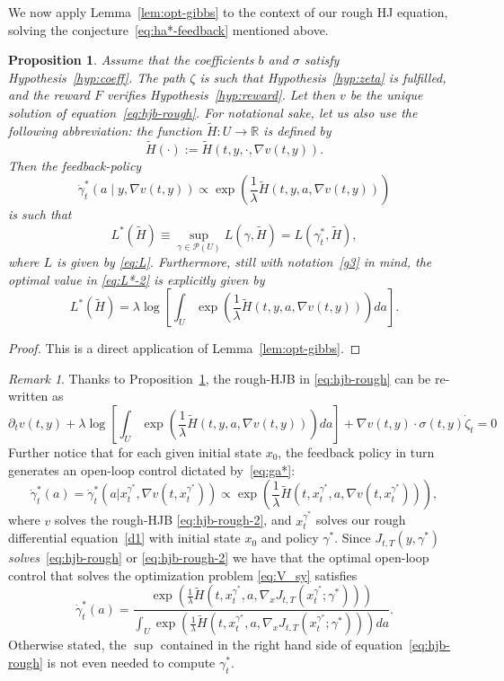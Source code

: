 \documentclass[12pt,reqno]{amsart}
\numberwithin{equation}{section}  %
\newcommand{\1}{{\bf 1}}
\newcommand{\2}{{\bf 2}}
\newcommand{\bzeta}{{\zeta}}
\newcommand{\R}{\mathbb R}
\newcommand{\cp}{\mathcal P}
\newcommand{\ga}{\gamma}
\newcommand{\la}{\lambda}
\newcommand{\si}{\sigma}
\newcommand{\lp}{\left(}
\newcommand{\rp}{\right)}
\newcommand{\lc}{\left[}
\newcommand{\rc}{\right]}
\newtheorem{proposition}[theorem]{Proposition}
\theoremstyle{remark}
\newtheorem{remark}[theorem]{Remark}
\theoremstyle{remark}
\newcommand{\beq}{\begin{equation}}
\newcommand{\eeq}{\end{equation}}
\begin{document}
\noindent
We now apply Lemma~\ref{lem:opt-gibbs} to the context of our rough HJ equation, solving the conjecture~\eqref{eq:ha*-feedback} mentioned above.
\begin{proposition}\label{prop:feedback-policy}
Assume that the coefficients $b$ and $\si$ satisfy Hypothesis~\ref{hyp:coeff}. The path $\bzeta$ is such that Hypothesis~\ref{hyp:zeta} is fulfilled, and the reward $F$ verifies Hypothesis~\ref{hyp:reward}.
Let then $v$ be the unique solution of equation~\eqref{eq:hjb-rough}. 
For notational sake, let us also use the following abbreviation: the function $\tilde{H}:U\to\R$ is defined by
\begin{equation}\label{g3}
\tilde{H}(\cdot) := \tilde{H}(t,y,\cdot,\nabla v(t,y)) .
\end{equation}
Then  the feedback-policy
\beq\label{eq:ga*}
\dot\ga_t^{\ast}(a \mid y, \nabla v(t,y)) \propto \exp \lp \dfrac{1}{\la}\tilde{H}(t,y,a, \nabla v(t,y)) \rp
\eeq
is such that
\beq\label{eq:L*-2}
L^{\ast}(\tilde{H}) \equiv 
\sup_{\ga \in \cp(U)} L(\ga, \tilde{H})
=
L({\ga}_t^{\ast}, \tilde{H}) ,
\eeq
where $L$ is given by \eqref{eq:L}.
Furthermore, still with notation~\eqref{g3} in mind, the optimal value in \eqref{eq:L*-2} is explicitly given by
\beq\label{eq:L*-2-value}
L^{\ast}(\tilde{H}) = \la \log \lc \int_U \exp\lp \frac{1}{\la} \tilde{H} (t,y,a, \nabla v(t,y))\rp da \rc.
\eeq
\end{proposition}
\begin{proof}
This is a direct application of Lemma~\ref{lem:opt-gibbs}.
\end{proof}
\begin{remark}\label{rem:opt-policy}
Thanks to Proposition~\ref{prop:feedback-policy}, the rough-HJB in \eqref{eq:hjb-rough} can be re-written as
\beq\label{eq:hjb-rough-2}
\partial_t v(t,y) +\la \log \lc \int_U \exp\lp \frac{1}{\la} \tilde{H} (t,y,a,\nabla v(t,y))\rp da \rc
	 + \nabla v(t,y) \cdot \sigma(t,y) \dot \zeta_t = 0
\eeq
Further notice that for each given initial state $x_0$, the feedback policy in turn generates an open-loop control dictated by~\eqref{eq:ga*}:
$$
\dot{\ga}_t^{\ast}(a)  = \dot{\ga}_t^{\ast}(a|x_t^{\ga^{\ast}}, \nabla v(t, x_t^{\ga^{\ast}})) \propto \exp \lp \frac{1}{\la} \tilde{H}(t, x_t^{\ga^{\ast}}, a, \nabla v(t, x_t^{\ga^{\ast}})) \rp,
$$
where $v$ solves the rough-HJB \eqref{eq:hjb-rough-2}, and $x_t^{\ga^{\ast}}$ solves our rough differential equation~\eqref{d1} with initial state $x_0$ and policy $\ga^{\ast}$.
Since $J_{t,T}(y, \ga^{\ast})$ \emph{solves}~\eqref{eq:hjb-rough} or \eqref{eq:hjb-rough-2} we have that the optimal open-loop control that solves the optimization problem \eqref{eq:V_sy} satisfies
\beq\label{eq:opt-policy-2}
\dot{\ga}_t^{\ast}(a)  = \dfrac{\exp \lp \frac{1}{\la} \tilde{H}(t, x_t^{\ga^{\ast}}, a, \nabla_x J_{t,T}(x_t^{\ga^{\ast}}; \ga^{\ast})) \rp}{\int_U \exp \lp \frac{1}{\la} \tilde{H}(t, x_t^{\ga^{\ast}}, a, \nabla_x J_{t,T}(x_t^{\ga^{\ast}}; \ga^{\ast})) \rp da}.
\eeq
Otherwise stated, the $\sup$ contained in the right hand side of equation~\eqref{eq:hjb-rough} is not even needed to compute ${\ga}_t^{\ast}$.
\end{remark}
\end{document}
